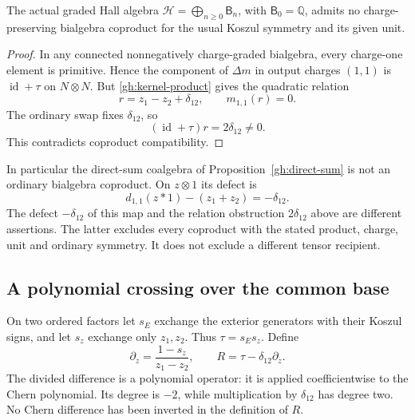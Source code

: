 \begin{proposition}
\label{gh:ordinary-obstruction}
The actual graded Hall algebra
$\mathcal H=\bigoplus_{n\geq0}\mathsf B_n$, with
$\mathsf B_0=\mathbb Q$, admits no charge-preserving bialgebra
coproduct for the usual Koszul symmetry and its given unit.
\end{proposition}
\begin{proof}
In any connected nonnegatively charge-graded bialgebra, every
charge-one element is primitive. Hence the component of
$\Delta m$ in output charges $(1,1)$ is
$\operatorname{id}+\tau$ on $N\otimes N$.
But \eqref{gh:kernel-product} gives the quadratic relation
\[
 r=z_1-z_2+\delta_{12},\qquad m_{1,1}(r)=0.
\]
The ordinary swap fixes $\delta_{12}$, so
\[
 (\operatorname{id}+\tau)r=2\delta_{12}\ne0.
\]
This contradicts coproduct compatibility.
\end{proof}

In particular the direct-sum coalgebra of
Proposition~\ref{gh:direct-sum} is not an ordinary bialgebra
coproduct. On $z\otimes1$ its defect is
\[
 d_{1,1}(z*1)-(z_1+z_2)=-\delta_{12}.
\]
The defect $-\delta_{12}$ of this map and the relation obstruction
$2\delta_{12}$ above are different assertions. The latter excludes
every coproduct with the stated product, charge, unit and ordinary
symmetry. It does not exclude a different tensor recipient.

\subsection{A polynomial crossing over the common base}

On two ordered factors let $s_E$ exchange the exterior generators
with their Koszul signs, and let $s_z$ exchange only $z_1,z_2$.
Thus $\tau=s_Es_z$. Define
\begin{equation}\label{gh:polynomial-R}
 \partial_z=\frac{1-s_z}{z_1-z_2},\qquad
 R=\tau-\delta_{12}\partial_z .
\end{equation}
The divided difference is a polynomial operator: it is applied
coefficientwise to the Chern polynomial. Its degree is $-2$,
while multiplication by $\delta_{12}$ has degree two. No Chern
difference has been inverted in the definition of $R$.

